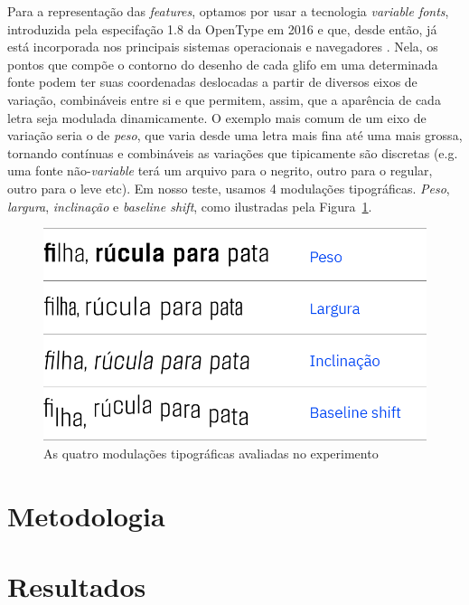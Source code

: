 \documentclass[11pt]{article}
\begin{document}
  Para a representação das {\itshape features}, optamos por usar a tecnologia {\itshape variable fonts}, introduzida pela especifação 1.8 da OpenType \cite{varfontssepcs} em 2016 e que, desde então, já está incorporada nos principais sistemas operacionais \cite{varfontossupport} e navegadores \cite{varfontbrowsersupport}. Nela, os pontos que compõe o contorno do desenho de cada glifo em uma determinada fonte podem ter suas coordenadas deslocadas a partir de diversos eixos de variação, combináveis entre si e que permitem, assim, que a aparência de cada letra seja modulada dinamicamente. O exemplo mais comum de um eixo de variação seria o de {\itshape peso}, que varia desde uma letra mais fina até uma mais grossa, tornando contínuas e combináveis as variações que tipicamente são discretas (e.g. uma fonte não-{\itshape variable} terá um arquivo para o negrito, outro para o regular, outro para o leve etc). Em nosso teste, usamos 4 modulações tipográficas. {\itshape Peso}, {\itshape largura}, {\itshape inclinação} e {\itshape baseline shift}, como ilustradas pela Figura~\ref{fig:type_modulations}.
  
\begin{figure}[H]
     {\centering
    \includegraphics[width=\linewidth]{fig/modulacoes.png}
     \caption{As quatro modulações tipográficas avaliadas no experimento}
     \label{fig:type_modulations}\par}
\end{figure}
  
  \section{Metodologia}
  \label{sec:metodologia}
 
  


\section{Resultados}
  \label{sec:resultados}
  
\end{document}
